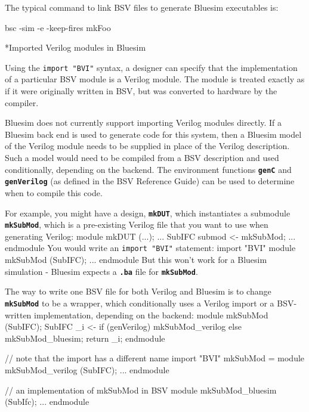 \documentclass{article}
\makeatletter
\newcommand{\te}[1]{\texttt{#1}}
\newenvironment{centerboxverbatim}
  {\center
   \boxedverbatim}
  {\endboxedverbatim
  {\endcenter }}
\def\subsubsubsection{\@startsection {subsubsubsection}{4}{\z@}{-3ex plus -1ex minus -.2ex}{1.25ex plus .2ex}{\normalsize\bf}*}
\makeatother
\begin{document}
The typical command to link  BSV files to generate    Bluesim
executables is:

\begin{centerboxverbatim}
bsc -sim -e -keep-fires mkFoo
\end{centerboxverbatim}


\subsubsubsection{Imported Verilog modules in Bluesim}
\label{importV-bluesim}

Using the \te{import "BVI"} syntax, a designer can specify that the
implementation of a particular BSV module is a Verilog module.  The
module is treated exactly as if it were originally written in BSV, but
was converted to hardware by the compiler.

Bluesim does not currently support importing Verilog modules
directly.  If a Bluesim back end is used to generate code for this
system,  then a
Bluesim model of the Verilog module  needs to be supplied in place
of the Verilog description.  Such a model would need to be compiled from a
BSV description and used conditionally, depending on the backend.  The
 environment
functions {\bf\tt genC} and {\bf\tt genVerilog} (as defined in the BSV
Reference Guide) can be used to determine when to compile this code.

For example, you might have a design, {\bf\tt mkDUT}, which
instantiates a submodule {\bf\tt mkSubMod}, which is a pre-existing
Verilog  file that you want to use when generating Verilog:
\begin{centerboxverbatim}
module mkDUT (...);
   ...
   SubIFC submod <- mkSubMod;
   ...
endmodule
\end{centerboxverbatim}
You would write an \te{import "BVI"} statement:
\begin{centerboxverbatim}
  import "BVI" module mkSubMod (SubIFC); ... endmodule
\end{centerboxverbatim}
But this won't work for a Bluesim simulation - Bluesim
expects a {\bf\tt .ba} file for {\bf\tt mkSubMod}.

The way to write one BSV file for both Verilog and Bluesim is to
change {\bf\tt mkSubMod} to be a wrapper, which conditionally uses a
Verilog  import or a BSV-written implementation, depending on the backend:
\begin{centerboxverbatim}
module mkSubMod (SubIFC);
   SubIFC _i <- if (genVerilog)
                   mkSubMod_verilog
                else
                   mkSubMod_bluesim;
   return _i;
endmodule

// note that the import has a different name
import "BVI" mkSubMod =
    module mkSubMod_verilog (SubIFC); ... endmodule

// an implementation of mkSubMod in BSV
module mkSubMod_bluesim (SubIfc);
   ...
endmodule
\end{centerboxverbatim}
\end{document}
